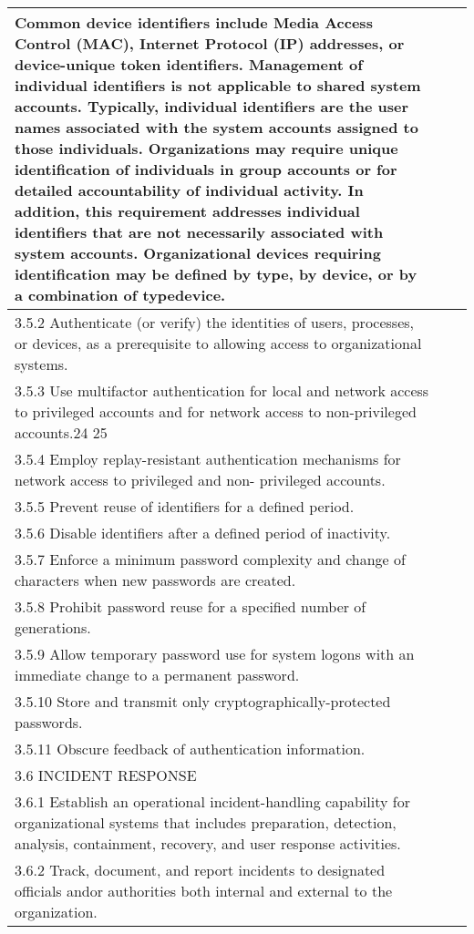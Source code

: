 \begin{longtable} {|p{}|p{}|p{} |}
{Common device identifiers include Media Access Control (MAC), Internet Protocol (IP) addresses, or device-unique token identifiers. Management of individual identifiers is not applicable to shared system accounts. Typically, individual identifiers are the user names associated with the system accounts assigned to those individuals. Organizations may require unique identification of individuals in group accounts or for detailed accountability of individual activity. In addition, this requirement addresses individual identifiers that are not necessarily associated with system accounts. Organizational devices requiring identification may be defined by type, by device, or by a combination of type\/device.}&& \\ \hline
{3.5.2 Authenticate (or verify) the identities of users, processes, or devices, as a prerequisite to allowing access to organizational systems.}&& \\ \hline
{3.5.3 Use multifactor authentication for local and network access to privileged accounts and for network access to non-privileged accounts.24 25}&& \\ \hline
{3.5.4 Employ replay-resistant authentication mechanisms for network access to privileged and non- privileged accounts.}&& \\ \hline
{3.5.5 Prevent reuse of identifiers for a defined period.}&& \\ \hline
{3.5.6 Disable identifiers after a defined period of inactivity.}&& \\ \hline
{3.5.7 Enforce a minimum password complexity and change of characters when new passwords are created.}&& \\ \hline
{3.5.8 Prohibit password reuse for a specified number of generations.}&& \\ \hline
{3.5.9 Allow temporary password use for system logons with an immediate change to a permanent password.}&& \\ \hline
{3.5.10 Store and transmit only cryptographically-protected passwords.}&& \\ \hline
{3.5.11 Obscure feedback of authentication information.}&& \\ \hline
{3.6 INCIDENT RESPONSE}&& \\ \hline
{3.6.1 Establish an operational incident-handling capability for organizational systems that includes preparation, detection, analysis, containment, recovery, and user response activities.}&& \\ \hline
{3.6.2 Track, document, and report incidents to designated officials and\/or authorities both internal and external to the organization.}&& \\ \hline

\end{longtable}
